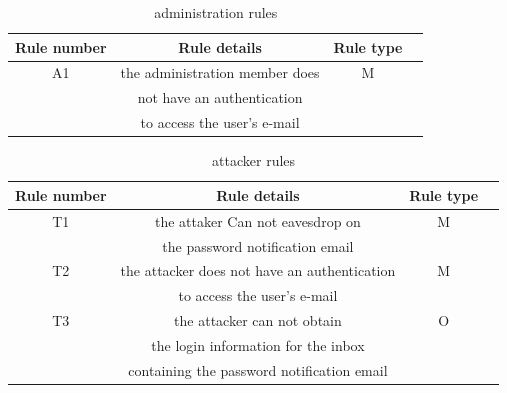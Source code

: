 \begin{table}[!htbp]         %
	\begin{center}
\begin{tabular}{|c|c|c|c|}
\hline 
 \textbf{ Rule number} & \textbf{Rule details}  & \textbf{Rule type} \\ 
\hline 
 A1 & the administration member does  & M \\&  not have an authentication \\ & to access the user's e-mail \\
\hline 
	\end{tabular}
	\end{center}
	\caption{ administration rules }
\label{adminrules}
\end{table} 

\begin{table}[!htbp]         %
	\begin{center}
\begin{tabular}{|c|c|c|c|}
\hline 
 \textbf{ Rule number} & \textbf{Rule details} & \textbf{Rule type} \\ 
\hline 
  T1 & the attaker Can not eavesdrop on & M \\& the password notification email \\  
\hline
 T2 & the attacker does not have an authentication & M 
 \\ & to access the user's e-mail \\
\hline
 T3 & the attacker can not obtain  & O \\ & the login information for the inbox \\ & containing the password notification email \\
\hline
	\end{tabular}
	\end{center}
	\caption{ attacker rules }
\label{attackrules}
\end{table} 
 
